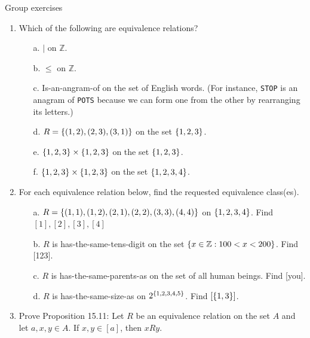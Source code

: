\documentclass[10pt]{beamer}
\begin{document}
\begin{frame}{Group exercises}
\footnotesize 
\begin{enumerate}
	\item Which of the following are equivalence relations?
	\begin{itemize} \footnotesize 
	\item[a.] $|$ on $\mathbb{Z}$.
	\item[b.] $\leq$ on $\mathbb{Z}$.
	\item[c.] Is-an-angram-of on the set of English words. (For instance, \texttt{STOP} is an anagram of \texttt{POTS} because we can form one from the other by rearranging its letters.)
	\item[d.] $R=\{ {(1,2),(2,3),(3,1)} \}$ on the set $\{ {1,2,3} \}$.
	\item[e.] $\{ {1,2,3} \} \times \{ {1,2,3} \}$ on the set $\{ {1,2,3} \}$.
	\item[f.] $\{ {1,2,3} \} \times \{ {1,2,3} \}$ on the set $\{ {1,2,3,4} \}$.
	\end{itemize}
	\item For each equivalence relation below, find the requested equivalence class(es).
	\begin{itemize} \footnotesize 
	\item[a.] $R=\{ {(1,1), (1,2), (2,1), (2,2), (3,3), (4,4)} \} $ on $\{ {1,2,3,4} \}$. Find $[1],[2],[3],[4]$
	\item[b.] $R$ is has-the-same-tens-digit on the set $\{ {x \in \mathbb{Z} : 100 < x < 200} \}$.  Find [123].
	\item[c.] $R$ is has-the-same-parents-as on the set of all human beings.  Find [you].
	\item[d.] $R$ is has-the-same-size-as on $2^{\{ {1,2,3,4,5} \}}$.  Find $[\{ {1,3} \}]$.
	\end{itemize}
\item Prove Proposition 15.11:  Let $R$ be an equivalence relation on the set $A$ and let $a,x,y \in A$. If $x,y \in [a]$, then $xRy$.
\end{enumerate}
	
\end{frame}
\end{document}
